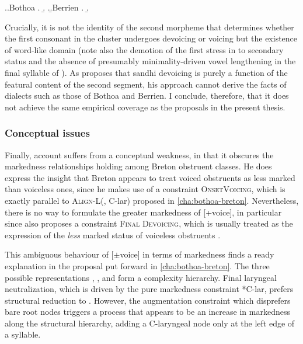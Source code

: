 \ex.\a.Bothoa \citep{humphreys95:_phonol_bothoa_saint_nicol_pelem}
\a.
\b.
\z.\b.Berrien \citep{ploneis}
\a.
\b.

Crucially, it is not the identity of the second morpheme that determines whether the first consonant in the cluster undergoes devoicing or voicing but the existence of word\hyp like domain (note also the demotion of the first stress in \ipa{[ˌkasˈpjan]} to secondary status and the absence of \dash presumably minimality\hyp driven \dash vowel lengthening in the final syllable of \ipa{[ˈɡwiːnisˈty]}). As \citet{kramer-breton} proposes that sandhi devoicing is purely a function of the featural content of the second segment, his approach cannot derive the facts of dialects such as those of Bothoa and Berrien. I conclude, therefore, that it does not achieve the same empirical coverage as the proposals in the present thesis.

\subsubsection{Conceptual issues}
\label{sec:conceptual-issues}

Finally,  account suffers from a conceptual weakness, in that it obscures the markedness relationships holding among Breton obstruent classes. He does express the insight that Breton appears to treat voiced obstruents as less marked than voiceless ones, since he makes use of a constraint \textsc{OnsetVoicing}, which is exactly parallel to \textsc{Align-L}(\sy, C-lar) proposed in \cref{cha:bothoa-breton}. Nevertheless, there is no way to formulate the greater markedness of [+voice], in particular since \citet{kramer-breton} also proposes a constraint \textsc{Final Devoicing}, which is usually treated as the expression of the \emph{less} marked status of voiceless obstruents \citep[\cfm][]{harris09:_why_final_obstr_devoic_is_weaken}.

This ambiguous behaviour of [$\pm$voice] in terms of markedness finds a ready explanation in the proposal put forward in \cref{cha:bothoa-breton}. The three possible representations \featurestring{\rt}, , and  form a complexity hierarchy. Final laryngeal neutralization, which is driven by the pure markedness constraint *C-lar, prefers structural reduction to \featurestring{\rt}. However, the augmentation constraint which disprefers bare root nodes triggers a process that appears to be an increase in markedness along the structural hierarchy, adding a C-laryngeal node only at the left edge of a syllable.

